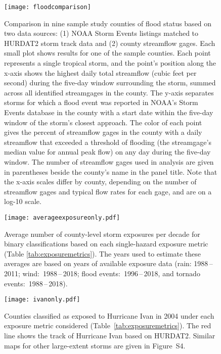 \begin{figure}[tbhp!]
\centering
\texttt{[image: floodcomparison]}
\caption{Comparison in nine sample study counties of flood status based on
	two data sources: (1) NOAA Storm Events listings matched to \ac{HURDAT2} storm track data
	and (2) county streamflow gages. Each small plot shows results for one of the sample
	counties. Each point represents a single tropical storm, and the
	point's position along the x-axis shows the highest daily total
	streamflow (cubic feet per second) during the five-day window surrounding the storm, 
	summed across all identified
	streamgages in the county. The y-axis separates storms
	for which a flood event was reported in NOAA's Storm Events database
	in the county with a start date within the five-day window of the
	storm's closest approach. The color of each point gives
	the percent of streamflow gages in the county with a daily streamflow
	that exceeded a threshold of flooding (the streamgage's median value
	for annual peak flow) on any day during the five-day window. The number
	of streamflow gages used in analysis are given in parentheses beside
	the county's name in the panel title.  Note that the x-axis scales
	differ by county, depending on the number of streamflow gages and
	typical flow rates for each gage, and are on a log-10 scale.
	}
\label{fig:floodcomparison}
\end{figure}

\clearpage

\begin{figure}%
\centering
\texttt{[image: averageexposureonly.pdf]} 
\caption{Average number of county-level storm exposures per decade for binary 
	classifications based on each
	single-hazard exposure metric (Table \ref{tab:exposuremetrics}). The years used to
	estimate these averages are based on years of available exposure data
	(rain: 1988\,--\,2011; wind:~1988\,--\,2018; flood events:~1996\,--\,2018, and
	tornado events:~1988\,--\,2018). } 
\label{fig:averageexposure} 
\end{figure}

\clearpage

\begin{figure}%
\centering
\texttt{[image: ivanonly.pdf]}
\caption{Counties classified as exposed to Hurricane Ivan in 2004 under each
	exposure metric considered (Table~\ref{tab:exposuremetrics}). The red
	line shows the track of Hurricane Ivan based on
	\ac{HURDAT2}.  Similar maps for other
	large-extent storms are given in Figure~S4.
	}
\label{fig:ivanexposure} 
\end{figure}

